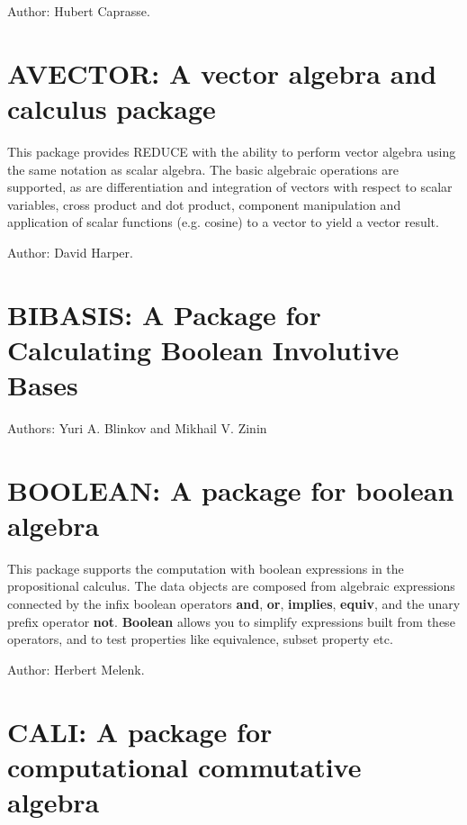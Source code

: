 Author: Hubert Caprasse.



\newpage

\section{AVECTOR: A vector algebra and calculus package}

This package provides REDUCE with the ability to perform vector algebra
using the same notation as scalar algebra.  The basic algebraic operations
are supported, as are differentiation and integration of vectors with
respect to scalar variables, cross product and dot product, component
manipulation and application of scalar functions (e.g. cosine) to a vector
to yield a vector result.

Author: David Harper.



\newpage

\section{BIBASIS: A Package for Calculating Boolean Involutive Bases}
 \label{BIBASIS}

Authors: Yuri A. Blinkov and Mikhail V. Zinin



\newpage

\section{BOOLEAN: A package for boolean algebra}

This package supports the computation with boolean expressions in the
propositional calculus.  The data objects are composed from algebraic
expressions connected by the infix boolean operators {\bf and}, {\bf or},
{\bf implies}, {\bf equiv}, and the unary prefix operator {\bf not}.
{\bf Boolean} allows you to simplify expressions built from these
operators, and to test properties like equivalence, subset property etc.

Author: Herbert Melenk.



\newpage

\section{CALI: A package for computational commutative algebra}

